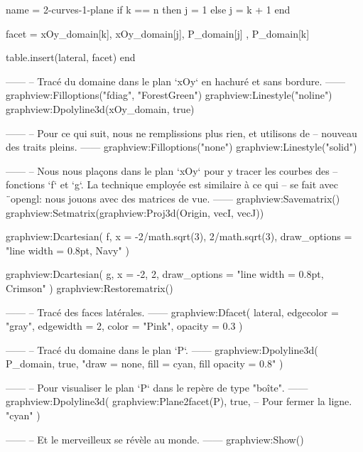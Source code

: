 \documentclass[border = 3pt]{standalone}
\begin{document}
\begin{luadraw*}{name = 2-curves-1-plane}
  if k == n then
    j = 1
  else
    j = k + 1
  end

  facet = {
    xOy_domain[k], xOy_domain[j],
    P_domain[j]  , P_domain[k]
  }

  table.insert(lateral, facet)
end

------
-- Tracé du domaine dans le plan `xOy` en hachuré et sans bordure.
------
graphview:Filloptions("fdiag", "ForestGreen")
graphview:Linestyle("noline")
graphview:Dpolyline3d(xOy_domain, true)

------
-- Pour ce qui suit, nous ne remplissions plus rien, et utilisons de
-- nouveau des traits pleins.
------
graphview:Filloptions("none")
graphview:Linestyle("solid")

------
-- Nous nous plaçons dans le plan `xOy` pour y tracer les courbes des
-- fonctions  `f` et `g`. La technique employée est similaire à ce qui
-- se fait avec ¨opengl: nous jouons avec des matrices de vue.
------
graphview:Savematrix()
  graphview:Setmatrix(graphview:Proj3d({Origin, vecI, vecJ}))

  graphview:Dcartesian(
    f,
    {
      x = {-2/math.sqrt(3), 2/math.sqrt(3)},
      draw_options = "line width = 0.8pt, Navy"
    }
  )

  graphview:Dcartesian(
    g,
    {
      x = {-2, 2},
      draw_options = "line width = 0.8pt, Crimson"
    }
  )
graphview:Restorematrix()

------
-- Tracé des faces latérales.
------
graphview:Dfacet(
  lateral,
  {
    edgecolor = "gray",
    edgewidth = 2,
    color   = "Pink",
    opacity   = 0.3
  }
)

------
-- Tracé du domaine dans le plan `P`.
------
graphview:Dpolyline3d(
  P_domain,
  true,
  "draw = none, fill = cyan, fill opacity = 0.8"
)

------
-- Pour visualiser le plan `P` dans le repère de type "boîte".
------
graphview:Dpolyline3d(
  graphview:Plane2facet(P),
  true,   -- Pour fermer la ligne.
  "cyan"
)

------
-- Et le merveilleux se révèle au monde.
------
graphview:Show()
\end{luadraw*}
\end{document}
